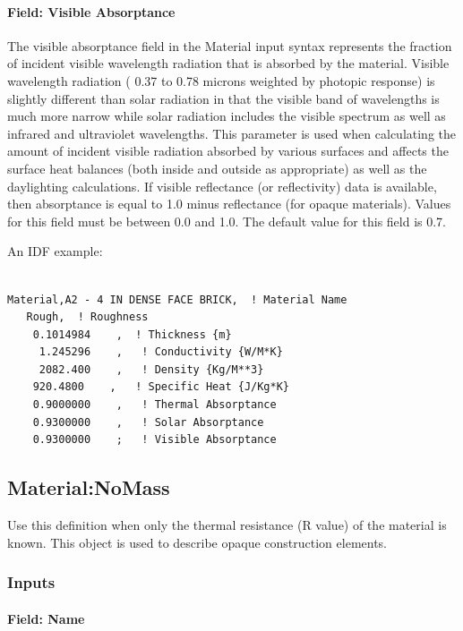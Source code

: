 \paragraph{Field: Visible Absorptance}\label{field-visible-absorptance}

The visible absorptance field in the Material input syntax represents the fraction of incident visible wavelength radiation that is absorbed by the material. Visible wavelength radiation ( 0.37 to 0.78 microns weighted by photopic response) is slightly different than solar radiation in that the visible band of wavelengths is much more narrow while solar radiation includes the visible spectrum as well as infrared and ultraviolet wavelengths. This parameter is used when calculating the amount of incident visible radiation absorbed by various surfaces and affects the surface heat balances (both inside and outside as appropriate) as well as the daylighting calculations. If visible reflectance (or reflectivity) data is available, then absorptance is equal to 1.0 minus reflectance (for opaque materials). Values for this field must be between 0.0 and 1.0. The default value for this field is 0.7.

An IDF example:

\begin{lstlisting}

Material,A2 - 4 IN DENSE FACE BRICK,  ! Material Name
   Rough,  ! Roughness
    0.1014984    ,  ! Thickness {m}
     1.245296    ,   ! Conductivity {W/M*K}
     2082.400    ,   ! Density {Kg/M**3}
    920.4800    ,   ! Specific Heat {J/Kg*K}
    0.9000000    ,   ! Thermal Absorptance
    0.9300000    ,   ! Solar Absorptance
    0.9300000    ;   ! Visible Absorptance
\end{lstlisting}

\subsection{Material:NoMass}\label{materialnomass}

Use this definition when only the thermal resistance (R value) of the material is known. This object is used to describe opaque construction elements.

\subsubsection{Inputs}\label{inputs-1-043}

\paragraph{Field: Name}\label{field-name-1-042}

